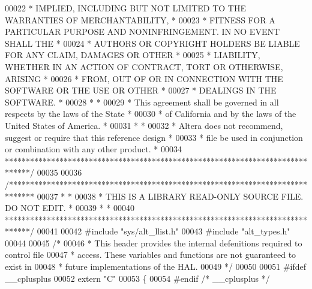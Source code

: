 \begin{DoxyCode}
00022 \textcolor{comment}{* IMPLIED, INCLUDING BUT NOT LIMITED TO THE WARRANTIES OF MERCHANTABILITY,    *}
00023 \textcolor{comment}{* FITNESS FOR A PARTICULAR PURPOSE AND NONINFRINGEMENT. IN NO EVENT SHALL THE *}
00024 \textcolor{comment}{* AUTHORS OR COPYRIGHT HOLDERS BE LIABLE FOR ANY CLAIM, DAMAGES OR OTHER      *}
00025 \textcolor{comment}{* LIABILITY, WHETHER IN AN ACTION OF CONTRACT, TORT OR OTHERWISE, ARISING     *}
00026 \textcolor{comment}{* FROM, OUT OF OR IN CONNECTION WITH THE SOFTWARE OR THE USE OR OTHER         *}
00027 \textcolor{comment}{* DEALINGS IN THE SOFTWARE.                                                   *}
00028 \textcolor{comment}{*                                                                             *}
00029 \textcolor{comment}{* This agreement shall be governed in all respects by the laws of the State   *}
00030 \textcolor{comment}{* of California and by the laws of the United States of America.              *}
00031 \textcolor{comment}{*                                                                             *}
00032 \textcolor{comment}{* Altera does not recommend, suggest or require that this reference design    *}
00033 \textcolor{comment}{* file be used in conjunction or combination with any other product.          *}
00034 \textcolor{comment}{******************************************************************************/}
00035 
00036 \textcolor{comment}{/******************************************************************************}
00037 \textcolor{comment}{*                                                                             *}
00038 \textcolor{comment}{* THIS IS A LIBRARY READ-ONLY SOURCE FILE. DO NOT EDIT.                       *}
00039 \textcolor{comment}{*                                                                             *}
00040 \textcolor{comment}{******************************************************************************/}
00041 
00042 \textcolor{preprocessor}{#include "sys/alt_llist.h"}
00043 \textcolor{preprocessor}{#include "alt_types.h"}
00044 
00045 \textcolor{comment}{/*}
00046 \textcolor{comment}{ * This header provides the internal defenitions required to control file }
00047 \textcolor{comment}{ * access. These variables and functions are not guaranteed to exist in }
00048 \textcolor{comment}{ * future implementations of the HAL.}
00049 \textcolor{comment}{ */}
00050 
00051 \textcolor{preprocessor}{#ifdef \_\_cplusplus}
00052 \textcolor{keyword}{extern} \textcolor{stringliteral}{"C"}
00053 \{
00054 \textcolor{preprocessor}{#endif }\textcolor{comment}{/* \_\_cplusplus */}\textcolor{preprocessor}{}

\end{DoxyCode}
